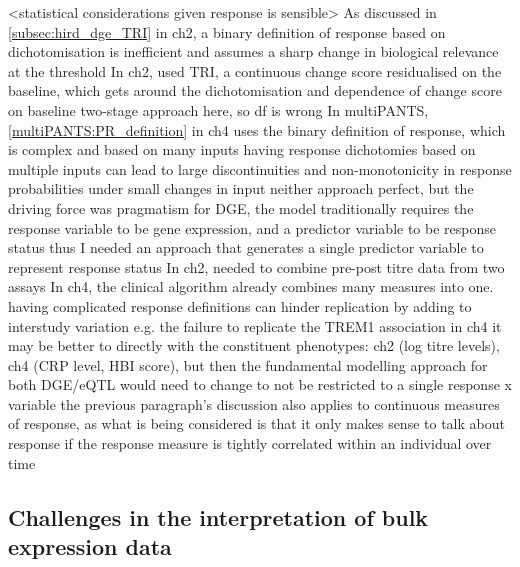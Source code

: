\begin{outline}
\1 <statistical considerations given response is sensible>
    \2 As discussed in \autoref{subsec:hird_dge_TRI} in ch2, a binary definition of response based on dichotomisation is inefficient and assumes a sharp change in biological relevance at the threshold
    \2 In ch2, used \gls{TRI}, a continuous change score residualised on the baseline, which gets around the dichotomisation and dependence of change score on baseline
        \2 two-stage approach here, so df is wrong
    \2 In multiPANTS, \autoref{multiPANTS:PR_definition} in ch4 uses the binary definition of response, which is complex and based on many inputs
        \3 having response dichotomies based on multiple inputs can lead to large discontinuities and non-monotonicity in response probabilities under small changes in input \autocite{senn2005DichotomaniaObsessiveCompulsive} 
    \2 neither approach perfect, but the driving force was pragmatism
        \3 for DGE, the model traditionally requires the response variable to be gene expression, and a predictor variable to be response status
        \3 thus I needed an approach that generates a single predictor variable to represent response status
        \3 In ch2, needed to combine pre-post titre data from two assays
        \3 In ch4, the clinical algorithm already combines many measures into one.
    \2 having complicated response definitions can hinder replication by adding to interstudy variation e.g. the failure to replicate the TREM1 association in ch4
    \2 it may be better to directly with the constituent phenotypes: ch2 (log titre levels), ch4 (CRP level, HBI score), but then the fundamental modelling approach for both DGE/eQTL would need to change to not be restricted to a single response x variable 
    \2 the previous paragraph's discussion also applies to continuous measures of response, as what is being considered is that it only makes sense to talk about response if the response measure is tightly correlated within an individual over time


\subsection{Challenges in the interpretation of bulk expression data}


\end{outline}
